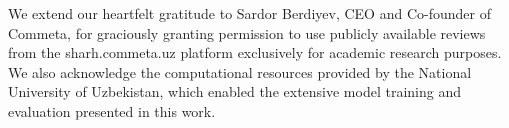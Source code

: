 \documentclass[runningheads]{llncs}
\begin{document}
\begin{credits}
\label{sec:acknowledgement}
\subsubsection{\ackname} We extend our heartfelt gratitude to Sardor Berdiyev, CEO and Co-founder of Commeta, for graciously granting permission to use publicly available reviews from the sharh.commeta.uz platform exclusively for academic research purposes. We also acknowledge the computational resources provided by the National University of Uzbekistan, which enabled the extensive model training and evaluation presented in this work.
\end{credits}






%
%
\end{document}
